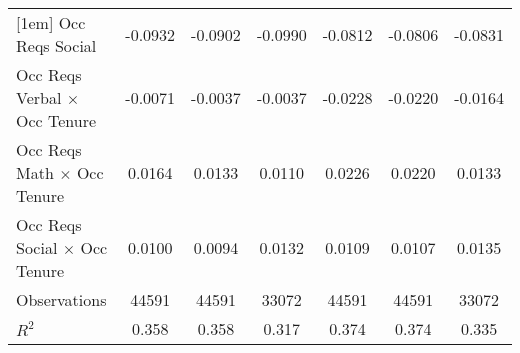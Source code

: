 {\begin{tabular}{l*{6}{c}}
[1em]
Occ Reqs Social     &     -0.0932\sym{***}&     -0.0902\sym{***}&     -0.0990\sym{***}&     -0.0812\sym{***}&     -0.0806\sym{***}&     -0.0831\sym{***}\\
[1em]
Occ Reqs Verbal $\times$ Occ Tenure&     -0.0071         &     -0.0037         &     -0.0037         &     -0.0228\sym{***}&     -0.0220\sym{***}&     -0.0164\sym{*}  \\
[1em]
Occ Reqs Math $\times$ Occ Tenure&      0.0164\sym{*}  &      0.0133         &      0.0110         &      0.0226\sym{***}&      0.0220\sym{***}&      0.0133\sym{*}  \\
[1em]
Occ Reqs Social $\times$ Occ Tenure&      0.0100\sym{***}&      0.0094\sym{***}&      0.0132\sym{***}&      0.0109\sym{***}&      0.0107\sym{***}&      0.0135\sym{***}\\
\hline  
Observations        &       44591         &       44591         &       33072         &       44591         &       44591         &       33072         \\
\(R^{2}\)           &       0.358         &       0.358         &       0.317         &       0.374         &       0.374         &       0.335         \\
\hline  
\end{tabular}
}

